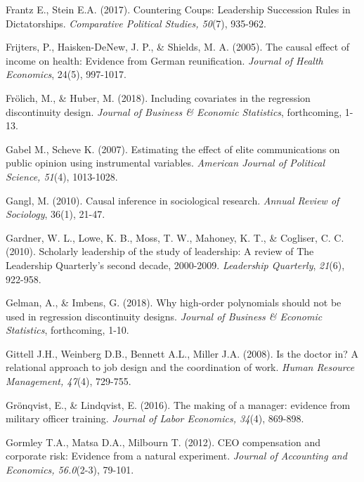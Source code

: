 \documentclass[english]{article}
\begin{document}
\begin{singlespace}
\begin{list}{}{\setlength\itemindent{-\leftmargin}}
\item *Frantz E., Stein E.A. (2017). Countering Coups: Leadership Succession Rules in Dictatorships. \emph{Comparative Political Studies, 50}(7), 935-962.

\item Frijters, P., Haisken-DeNew, J. P., \& Shields, M. A. (2005). The causal effect of income on health: Evidence from German reunification.  \emph{Journal of Health Economics}, 24(5), 997-1017.  

\item Frölich, M., \& Huber, M. (2018). Including covariates in the regression discontinuity design. \emph{Journal of Business \& Economic Statistics}, forthcoming, 1-13.

\item *Gabel M., Scheve K. (2007). Estimating the effect of elite communications on public opinion using instrumental variables.  \emph{American Journal of Political Science, 51}(4), 1013-1028.

\item Gangl, M. (2010). Causal inference in sociological research.  \emph{Annual Review of Sociology}, 36(1), 21-47. 

\item Gardner, W. L., Lowe, K. B., Moss, T. W., Mahoney, K. T., \& Cogliser, C. C. (2010). Scholarly leadership of the study of leadership: A review of The Leadership Quarterly's second decade, 2000-2009. \emph{Leadership Quarterly}, \emph{21}(6), 922-958.

\item Gelman, A., \& Imbens, G. (2018). Why high-order polynomials should not be used in regression discontinuity designs. \emph{Journal of Business \& Economic Statistics}, forthcoming, 1-10.

\item *Gittell J.H., Weinberg D.B., Bennett A.L., Miller J.A. (2008). Is the doctor in? A relational approach to job design and the coordination of work. \emph{Human Resource Management, 47}(4), 729-755.

\item *Grönqvist, E., \& Lindqvist, E. (2016). The making of a manager: evidence from military officer training. \emph{Journal of Labor Economics, 34}(4), 869-898.

\item *Gormley T.A., Matsa D.A., Milbourn T. (2012). CEO compensation and corporate risk: Evidence from a natural experiment. \emph{Journal of Accounting and Economics, 56.0}(2-3), 79-101.


\end{list}
\end{singlespace}
\end{document}
